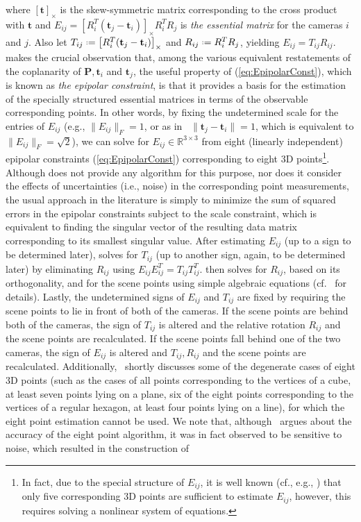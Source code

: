 \documentclass[10pt]{article}
\newcommand{\R}{\ensuremath{\mathbb{R}}}
\newcommand*{\defeq}{\mathrel{\vcenter{\baselineskip0.5ex \lineskiplimit0pt
                     \hbox{\scriptsize.}\hbox{\scriptsize.}}}
                     =}
\begin{document}
where $[\mathbf{t}]_{\times}$ is the skew-symmetric matrix corresponding to the cross product with $\mathbf{t}$ and $E_{ij} = \left[R_i^T(\mathbf{t}_{j}-\mathbf{t}_{i})\right]_{\times}R_{i}^TR_j$ is \textit{the essential matrix} for the cameras $i$ and $j$. Also let $T_{ij}\defeq\left[R_i^T(\mathbf{t}_{j}-\mathbf{t}_{i})\right]_{\times}$ and $R_{ij} \defeq R_{i}^TR_j$, yielding $E_{ij} = T_{ij}R_{ij}$. \cite{LonguetHiggins} makes the crucial observation that, among the various equivalent restatements of the coplanarity of $\mathbf{P},\mathbf{t}_i$ and $\mathbf{t}_j$, the useful property of (\ref{eq:EpipolarConst}), which is known as \textit{the epipolar constraint}, is that it provides a basis for the estimation of the specially structured essential matrices in terms of the observable corresponding points. In other words, by fixing the undetermined scale for the entries of $E_{ij}$ (e.g., $\|E_{ij}\|_F = 1$, or as in~\cite{LonguetHiggins} $\|\mathbf{t}_{j}-\mathbf{t}_{i}\| = 1$, which is equivalent to $\|E_{ij}\|_F = \sqrt{2}$), we can solve for $E_{ij}\in\R^{3\times3}$ from eight (linearly independent) epipolar constraints (\ref{eq:EpipolarConst}) corresponding to eight $3$D points\footnote{In fact, due to the special structure of $E_{ij}$, it is well known (cf., e.g., \cite{HartleyBook}) that only five corresponding $3$D points are sufficient to estimate $E_{ij}$, however, this requires solving a nonlinear system of equations.}. Although \cite{LonguetHiggins} does not provide any algorithm for this purpose, nor does it consider the effects of uncertainties (i.e., noise) in the corresponding point measurements, the usual approach in the literature is simply to minimize the sum of squared errors in the epipolar constraints subject to the scale constraint, which is equivalent to finding the singular vector of the resulting data matrix corresponding to its smallest singular value. After estimating $E_{ij}$ (up to a sign to be determined later), \cite{LonguetHiggins} solves for $T_{ij}$ (up to another sign, again, to be determined later) by eliminating $R_{ij}$ using $E_{ij}E_{ij}^T = T_{ij}T_{ij}^T$. \cite{LonguetHiggins} then solves for $R_{ij}$, based on its orthogonality, and for the scene points using simple algebraic equations (cf.~\cite{LonguetHiggins} for details). Lastly, the undetermined signs of $E_{ij}$ and $T_{ij}$ are fixed by requiring the scene points to lie in front of both of the cameras. If the scene points are behind both of the cameras, the sign of $T_{ij}$ is altered and the relative rotation $R_{ij}$ and the scene points are recalculated. If the scene points fall behind one of the two cameras, the sign of $E_{ij}$ is altered and $T_{ij}, R_{ij}$ and the scene points are recalculated. Additionally,~\cite{LonguetHiggins} shortly discusses some of the degenerate cases of eight $3$D points (such as the cases of all points corresponding to the vertices of a cube, at least seven points lying on a plane, six of the eight points corresponding to the vertices of a regular hexagon, at least four points lying on a line), for which the eight point estimation cannot be used. We note that, although~\cite{LonguetHiggins} argues about the accuracy of the eight point algorithm, it was in fact observed to be sensitive to noise, which resulted in the construction of 
\end{document}
